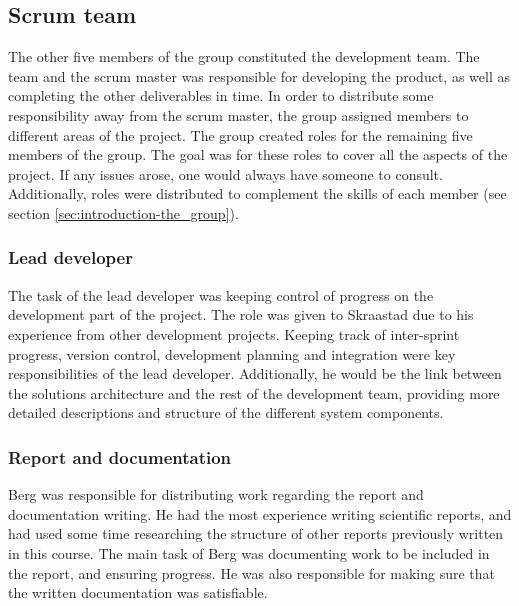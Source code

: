 \subsection{Scrum team}
\label{subsec:process_and_methodology-project_organization-scrum_team}

The other five members of the group constituted the development team. The team and the scrum master was responsible for developing the product, as well as completing the other deliverables in time. In order to distribute some responsibility away from the scrum master, the group assigned members to different areas of the project. The group created roles for the remaining five members of the group. The goal was for these roles to cover all the aspects of the project. If any issues arose, one would always have someone to consult. Additionally, roles were distributed to complement the skills of each member (see section \ref{sec:introduction-the_group}).

\subsubsection{Lead developer}
\label{subsec:process_and_methodology-project_organization-lead_developer}

The task of the lead developer was keeping control of progress on the development part of the project. The role was given to Skraastad due to his experience from other development projects. Keeping track of inter-sprint progress, version control, development planning and integration were key responsibilities of the lead developer. Additionally, he would be the link between the solutions architecture and the rest of the development team, providing more detailed descriptions and structure of the different system components.

\subsubsection{Report and documentation}
\label{subsec:process_and_methodology-project_organization-report_and_documentation}

Berg was responsible for distributing work regarding the report and documentation writing. He had the most experience writing scientific reports, and had used some time researching the structure of other reports previously written in this course. The main task of Berg was documenting work to be included in the report, and ensuring progress. He was also responsible for making sure that the written documentation was satisfiable.

